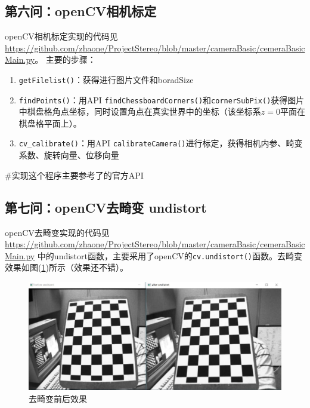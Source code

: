 \documentclass[UTF8]{ctexart}
\begin{document}
\subsection{第六问：openCV相机标定}
openCV相机标定实现的代码见\url{https://github.com/zhaone/ProjectStereo/blob/master/cameraBasic/cemeraBasicMain.py}。 主要的步骤：
\begin{enumerate}
  \item \verb"getFilelist()"：获得进行图片文件和boradSize
  \item \verb"findPoints()"：用API \verb"findChessboardCorners()"和\verb"cornerSubPix()"获得图片中棋盘格角点坐标，同时设置角点在真实世界中的坐标（该坐标系$z=0$平面在棋盘格平面上）。
  \item \verb"cv_calibrate()"：用API \verb"calibrateCamera()"进行标定，获得相机内参、畸变系数、旋转向量、位移向量
\end{enumerate}
\#实现这个程序主要参考了\cite{opencvCameraCalibrationl18830}的官方API
\subsection{第七问：openCV去畸变 undistort}
openCV去畸变实现的代码见\url{https://github.com/zhaone/ProjectStereo/blob/master/cameraBasic/cemeraBasicMain.py} 中的undistort函数，主要采用了openCV的\verb"cv.undistort()"函数。去畸变效果如图(\ref{fig:distort})所示（效果还不错）。
\begin{figure}[htp]%
	\centering  %
	\includegraphics[width=0.9\linewidth]{./figures/undistort.jpg} %
	\caption{去畸变前后效果}  %
	\label{fig:distort}   %
\end{figure}\\
\end{document}
